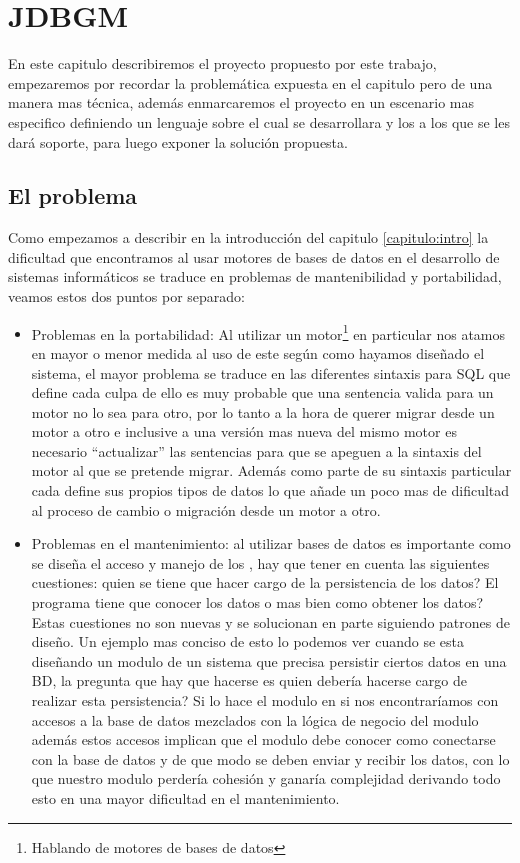 \chapter{JDBGM}
En este capitulo describiremos el proyecto propuesto por este trabajo, empezaremos por recordar la problemática expuesta en el capitulo  pero de una manera mas técnica, además enmarcaremos el proyecto en un escenario mas especifico definiendo un lenguaje sobre el cual se desarrollara y los \dd a los que se les dará soporte, para luego exponer la solución propuesta.

\section{El problema}
Como empezamos a describir en la introducción del capitulo \ref{capitulo:intro} la dificultad que encontramos al usar motores de bases de datos en el desarrollo de sistemas informáticos se traduce en problemas de mantenibilidad y portabilidad, veamos estos dos puntos por separado:
\begin{itemize}
\item Problemas en la portabilidad: Al utilizar un motor\footnote{Hablando de motores de bases de datos} en particular nos atamos en mayor o menor medida al uso de este según como hayamos diseñado el sistema, el mayor problema se traduce en las diferentes sintaxis para SQL que define cada \dd culpa de ello es muy probable que una sentencia valida para un motor no lo sea para otro, por lo tanto a la hora de querer migrar desde un motor a otro e inclusive a una versión mas nueva del mismo motor es necesario  ``actualizar'' las sentencias para que se apeguen a la sintaxis del motor al que se pretende migrar. Además como parte de su sintaxis particular cada \dd define sus propios tipos de datos lo que añade un poco mas de dificultad al proceso de cambio o migración desde un motor a otro.  
\item  Problemas en el mantenimiento: al utilizar bases de datos es importante como se diseña el acceso y manejo de los \dd, hay que tener en cuenta las siguientes cuestiones: quien se tiene que hacer cargo de la persistencia de los datos? El programa tiene que conocer los datos o mas bien como obtener los datos? Estas cuestiones no son nuevas y se solucionan en parte siguiendo patrones de diseño. Un ejemplo mas conciso de esto lo podemos ver cuando se esta diseñando un modulo de un sistema que precisa persistir ciertos datos en una BD, la pregunta que hay que hacerse es quien debería hacerse cargo de realizar esta persistencia? Si lo hace el modulo en si nos encontraríamos con accesos a la base de datos mezclados con la lógica de negocio del modulo además estos accesos implican que el modulo debe conocer como conectarse con la base de datos y de que modo se deben enviar y recibir los datos, con lo que nuestro modulo	perdería cohesión y ganaría complejidad derivando todo esto en una mayor dificultad en el mantenimiento.
\end{itemize}
